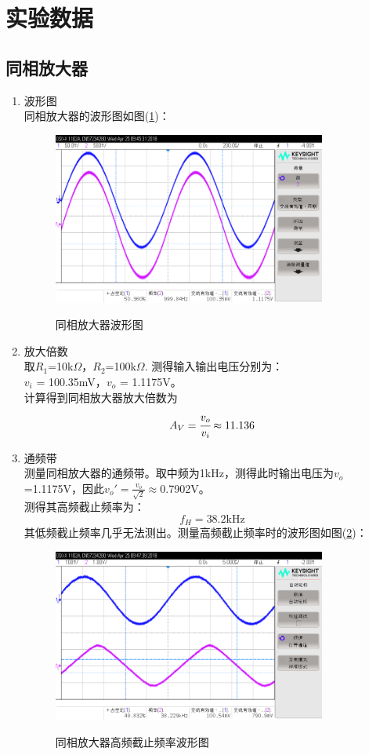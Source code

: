 \documentclass[a4paper]{article}
\begin{document}
\section{实验数据}
\subsection{同相放大器}
\begin{enumerate}
\item 波形图\\
同相放大器的波形图如图(\ref{fig1})：
\begin{figure}[!h]
\centering
\includegraphics[width=9cm]{fig/1cope_2_r.png}\\
\caption{同相放大器波形图}\label{fig1}
\end{figure}
\item 放大倍数\\
取$R_1$=10k$\Omega$，$R_2$=100k$\Omega$. 测得输入输出电压分别为：\\
$v_i$ = 100.35mV，$v_o$ = 1.1175V。\\
计算得到同相放大器放大倍数为
\begin{equation}
A_V = \cfrac{v_o}{v_i} \approx 11.136
\end{equation}
\item 通频带\\
测量同相放大器的通频带。取中频为1kHz，测得此时输出电压为$v_o$=1.1175V，因此$v_o' = \frac{v_o}{\sqrt{2}} \approx$0.7902V。\\
测得其高频截止频率为：
$$f_H = 38.2\text{kHz}$$
其低频截止频率几乎无法测出。测量高频截止频率时的波形图如图(\ref{fig2})：
\begin{figure}[!h]
\centering
\includegraphics[width=9cm]{fig/2cope_3_r.png}\\
\caption{同相放大器高频截止频率波形图}\label{fig2}
\end{figure}
\end{enumerate}
\end{document}
